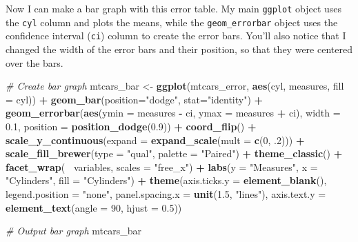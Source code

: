 \documentclass[
]{book}
\newenvironment{Shaded}{\begin{snugshade}}{\end{snugshade}}
\newcommand{\CommentTok}[1]{\textcolor[rgb]{0.56,0.35,0.01}{\textit{#1}}}
\newcommand{\DataTypeTok}[1]{\textcolor[rgb]{0.13,0.29,0.53}{#1}}
\newcommand{\DecValTok}[1]{\textcolor[rgb]{0.00,0.00,0.81}{#1}}
\newcommand{\FloatTok}[1]{\textcolor[rgb]{0.00,0.00,0.81}{#1}}
\newcommand{\KeywordTok}[1]{\textcolor[rgb]{0.13,0.29,0.53}{\textbf{#1}}}
\newcommand{\NormalTok}[1]{#1}
\newcommand{\OperatorTok}[1]{\textcolor[rgb]{0.81,0.36,0.00}{\textbf{#1}}}
\newcommand{\StringTok}[1]{\textcolor[rgb]{0.31,0.60,0.02}{#1}}
\begin{document}
Now I can make a bar graph with this error table. My main \texttt{ggplot} object uses the \texttt{cyl} column and plots the means, while the \texttt{geom\_errorbar} object uses the confidence interval (\texttt{ci}) column to create the error bars. You'll also notice that I changed the width of the error bars and their position, so that they were centered over the bars.

\begin{Shaded}
\begin{Highlighting}[]
\CommentTok{# Create bar graph}
\NormalTok{mtcars_bar <-}\StringTok{ }\KeywordTok{ggplot}\NormalTok{(mtcars_error, }\KeywordTok{aes}\NormalTok{(cyl, measures, }\DataTypeTok{fill =}\NormalTok{ cyl)) }\OperatorTok{+}
\StringTok{  }\KeywordTok{geom_bar}\NormalTok{(}\DataTypeTok{position=}\StringTok{"dodge"}\NormalTok{, }\DataTypeTok{stat=}\StringTok{"identity"}\NormalTok{) }\OperatorTok{+}
\StringTok{  }\KeywordTok{geom_errorbar}\NormalTok{(}\KeywordTok{aes}\NormalTok{(}\DataTypeTok{ymin =}\NormalTok{ measures }\OperatorTok{-}\StringTok{ }\NormalTok{ci, }\DataTypeTok{ymax =}\NormalTok{ measures }\OperatorTok{+}\StringTok{ }\NormalTok{ci), }
                \DataTypeTok{width =} \FloatTok{0.1}\NormalTok{, }\DataTypeTok{position =} \KeywordTok{position_dodge}\NormalTok{(}\FloatTok{0.9}\NormalTok{)) }\OperatorTok{+}
\StringTok{  }\KeywordTok{coord_flip}\NormalTok{() }\OperatorTok{+}
\StringTok{  }\KeywordTok{scale_y_continuous}\NormalTok{(}\DataTypeTok{expand =} \KeywordTok{expand_scale}\NormalTok{(}\DataTypeTok{mult =} \KeywordTok{c}\NormalTok{(}\DecValTok{0}\NormalTok{, }\FloatTok{.2}\NormalTok{))) }\OperatorTok{+}
\StringTok{  }\KeywordTok{scale_fill_brewer}\NormalTok{(}\DataTypeTok{type =} \StringTok{"qual"}\NormalTok{, }\DataTypeTok{palette =} \StringTok{"Paired"}\NormalTok{) }\OperatorTok{+}
\StringTok{  }\KeywordTok{theme_classic}\NormalTok{() }\OperatorTok{+}
\StringTok{  }\KeywordTok{facet_wrap}\NormalTok{(}\OperatorTok{~}\StringTok{ }\NormalTok{variables, }\DataTypeTok{scales =} \StringTok{"free_x"}\NormalTok{) }\OperatorTok{+}
\StringTok{  }\KeywordTok{labs}\NormalTok{(}\DataTypeTok{y =} \StringTok{"Measures"}\NormalTok{,}
       \DataTypeTok{x =} \StringTok{"Cylinders"}\NormalTok{,}
       \DataTypeTok{fill =} \StringTok{"Cylinders"}\NormalTok{) }\OperatorTok{+}
\StringTok{  }\KeywordTok{theme}\NormalTok{(}\DataTypeTok{axis.ticks.y =} \KeywordTok{element_blank}\NormalTok{(),}
        \DataTypeTok{legend.position =} \StringTok{"none"}\NormalTok{,}
        \DataTypeTok{panel.spacing.x =} \KeywordTok{unit}\NormalTok{(}\FloatTok{1.5}\NormalTok{, }\StringTok{"lines"}\NormalTok{),}
        \DataTypeTok{axis.text.y =} \KeywordTok{element_text}\NormalTok{(}\DataTypeTok{angle =} \DecValTok{90}\NormalTok{, }\DataTypeTok{hjust =} \FloatTok{0.5}\NormalTok{))}

\CommentTok{# Output bar graph}
\NormalTok{mtcars_bar}
\end{Highlighting}
\end{Shaded}
\end{document}
